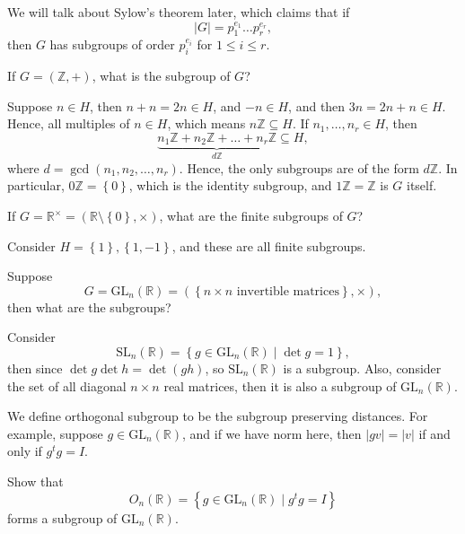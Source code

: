 \begin{note}
    We will talk about Sylow's theorem later, which claims that if
    \[
        \vert G \vert = p_1^{e_1} \dots p_r^{e_r},
    \] then \(G\) has subgroups of order \(p_i^{e_i}\) for \(1 \le i \le r\).  
\end{note}

\begin{eg}
    If \(G=(\mathbb{Z} , +)\), what is the subgroup of \(G\)?
\end{eg}
\begin{explanation}
    Suppose \(n \in H\), then \(n + n = 2n \in H\), and \(-n \in H\), and then \(3n = 2n + n \in H \). Hence, all multiples of \(n \in H\), which means \(n \mathbb{Z} \subseteq H\). If \(n_1, \dots , n_r \in H\), then 
    \[
        \underbrace{n_1 \mathbb{Z} + n_2\mathbb{Z} + \dots + n_r\mathbb{Z}}_{d\mathbb{Z} } \subseteq H,
    \] where \(d = \gcd(n_1, n_2, \dots , n_r)\). Hence, the only subgroups are of the form \(d \mathbb{Z}\). In particular, \(0 \mathbb{Z} = \left\{ 0 \right\} \), which is the identity subgroup, and \(1 \mathbb{Z} = \mathbb{Z} \) is \(G\) itself.       
\end{explanation}

\begin{eg}
    If \(G = \mathbb{R} ^{\times } = (\mathbb{R} \setminus \left\{ 0 \right\}, \times  )\), what are the finite subgroups of \(G\)? 
\end{eg}
\begin{explanation}
    Consider \(H = \left\{ 1 \right\}, \left\{ 1, -1 \right\}  \), and these are all finite subgroups. 
\end{explanation}

\begin{eg}
    Suppose 
    \[
        G = \mathrm{GL}_n(\mathbb{R}) = \left( \left\{ n \times n \text{ invertible matrices} \right\}, \times \right),  
    \] then what are the subgroups?
\end{eg}
\begin{explanation}
    Consider 
    \[
        \mathrm{SL}_n(\mathbb{R} ) = \left\{ g \in \mathrm{GL}_n(\mathbb{R} ) \mid \det g = 1 \right\},  
    \] then since \(\det g \det h = \det (gh)\), so \(\mathrm{SL}_n(\mathbb{R} ) \) is a subgroup. Also, consider the set of all diagonal \(n \times n\) real matrices, then it is also a subgroup of \(\mathrm{GL}_n(\mathbb{R} ) \).    
\end{explanation}

\begin{remark}
    We define orthogonal subgroup to be the subgroup preserving distances. For example, suppose \(g \in \mathrm{GL}_n(\mathbb{R} ) \), and if we have norm here, then \(\vert gv \vert = \vert v \vert  \) if and only if \(g^t g = I\).  
\end{remark}

\begin{exercise}
    Show that 
    \[
        O_n(\mathbb{R} ) = \left\{ g \in \mathrm{GL}_n(\mathbb{R} ) \mid g^t g = I\right\} 
    \] forms a subgroup of \(\mathrm{GL}_n(\mathbb{R} ) \). 
\end{exercise}
